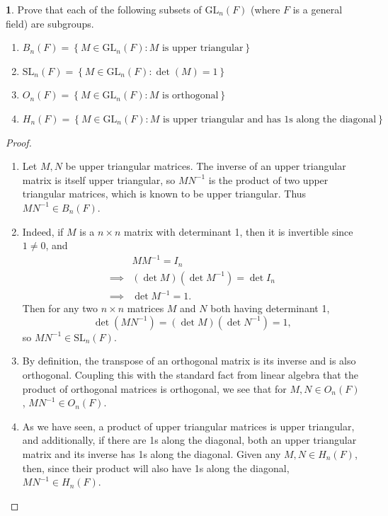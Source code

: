 \documentclass[12pt]{article}
\theoremstyle{definition}
\newtheorem{ex}{}
\begin{document}
\begin{ex}
	Prove that each of the following subsets of $\mathrm{GL}_n(F)$ (where $F$ is a general field) are subgroups.
	\begin{enumerate}[label=(\alph*)]
		\item $B_n(F) = \left\lbrace M \in \mathrm{GL}_n(F) : M \text{ is upper triangular} \right\rbrace$
		\item $\mathrm{SL}_n(F) = \left\lbrace M \in \mathrm{GL}_n(F) : \det(M) = 1 \right\rbrace$
		\item $O_n(F) = \left\lbrace M \in \mathrm{GL}_n(F) : M \text{ is orthogonal} \right\rbrace$
		\item $H_n(F) = \left\lbrace M \in \mathrm{GL}_n(F) : M \text{ is upper triangular and has 1s along the diagonal} \right\rbrace$
	\end{enumerate}
\end{ex}
\begin{proof}
	\begin{enumerate}[label=(\alph*)]
		\item Let $M, N$ be upper triangular matrices.
		      The inverse of an upper triangular matrix is itself upper triangular, so $MN^{-1}$ is the product of two upper triangular matrices, which is known to be upper triangular.
          Thus $MN^{-1} \in B_n(F)$.
		\item Indeed, if $M$ is a $n \times n$ matrix with determinant 1, then it is invertible since $1 \neq 0$, and \begin{align*}
			               & MM^{-1} = I_n                     \\
			      \implies & (\det M) (\det M^{-1}) = \det I_n \\
			      \implies & \det M^{-1} = 1.
		      \end{align*}
		      Then for any two $n \times n$ matrices $M$ and $N$ both having determinant 1, \begin{equation*}
			      \det(MN^{-1}) = (\det M) (\det N^{-1}) = 1,
		      \end{equation*}
          so $MN^{-1} \in \mathrm{SL}_n(F)$.
        \item By definition, the transpose of an orthogonal matrix is its inverse and is also orthogonal. Coupling this with the standard fact from linear algebra that the product of orthogonal matrices is orthogonal, we see that for $M, N \in O_n(F)$, $MN^{-1} \in O_n(F)$.
        \item As we have seen, a product of upper triangular matrices is upper triangular, and additionally, if there are 1s along the diagonal, both an upper triangular matrix and its inverse has 1s along the diagonal.
          Given any $M, N \in H_n(F)$, then, since their product will also have 1s along the diagonal, $MN^{-1} \in H_n(F)$.
	\end{enumerate}
\end{proof}
\end{document}
